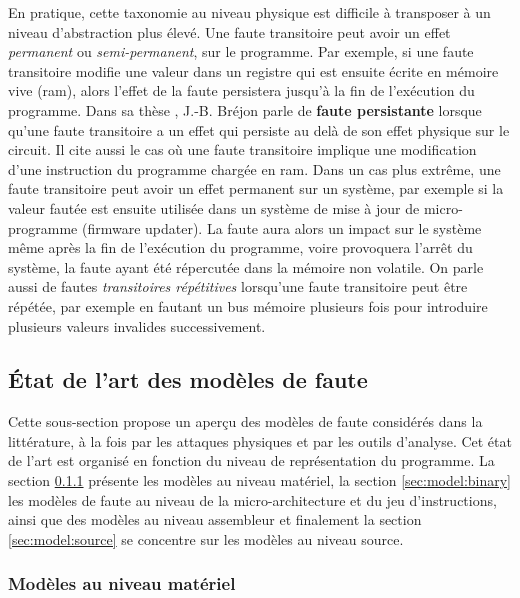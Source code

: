                 En pratique, cette taxonomie au niveau physique est difficile à transposer à un niveau d'abstraction plus élevé. Une faute transitoire peut avoir un effet \textit{permanent} ou \textit{semi-permanent}, sur le programme.
                Par exemple, si une faute transitoire modifie une valeur dans un registre qui est ensuite écrite en mémoire vive (\gls{ram}), alors l'effet de la faute persistera jusqu'à la fin de l'exécution du programme. Dans sa thèse \cite{Brejon/Phd20}, J.-B. Bréjon parle de \textbf{faute persistante} lorsque qu'une faute transitoire a un effet qui persiste au delà de son effet physique sur le circuit. Il cite aussi le cas où une faute transitoire implique une modification d'une instruction du programme chargée en \gls{ram}.
                Dans un cas plus extrême, une faute transitoire peut avoir un effet permanent sur un système, par exemple si la valeur fautée est ensuite utilisée dans un système de mise à jour de micro-programme (firmware updater). La faute aura alors un impact sur le système même après la fin de l'exécution du programme, voire provoquera l'arrêt du système, la faute ayant été répercutée dans la mémoire non volatile.
                On parle aussi de fautes \textit{transitoires répétitives} \cite{Berthome/ARES12} lorsqu'une faute transitoire peut être répétée, par exemple en fautant un bus mémoire plusieurs fois pour introduire plusieurs valeurs invalides successivement.
            
        \subsection{État de l'art des modèles de faute}
        \label{sec:soa-models}
        
            Cette sous-section propose un aperçu des modèles de faute considérés dans la littérature, à la fois par les attaques physiques et par les outils d'analyse. Cet état de l'art est organisé en fonction du niveau de représentation du programme.
            La section \ref{sec:model:physic} présente les modèles au niveau matériel, la section \ref{sec:model:binary} les modèles de faute au niveau de la micro-architecture et du jeu d'instructions, ainsi que des modèles au niveau assembleur et finalement la section \ref{sec:model:source} se concentre sur les modèles au niveau source.
        
            \subsubsection{Modèles au niveau matériel}
            \label{sec:model:physic}
            
